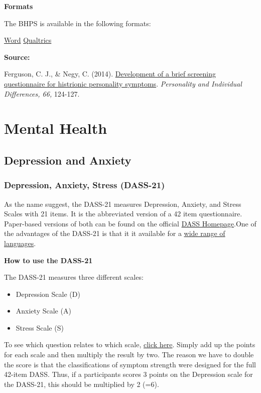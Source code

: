 \documentclass[
]{book}
\providecommand{\tightlist}{%
  \setlength{\itemsep}{0pt}\setlength{\parskip}{0pt}}
\begin{document}
\textbf{Formats}

The BHPS is available in the following formats:

\href{/questionnaires/BriefHistrionicPersonalityScale.docx}{Word} \textbar{} \href{/questionnaires/BriefHistrionicPersonalityScale.qsf}{Qualtrics}

\textbf{Source:}

Ferguson, C. J., \& Negy, C. (2014). \href{https://www.christopherjferguson.com/Histrionic.pdf}{Development of a brief screening questionnaire for histrionic personality symptoms}. \emph{Personality and Individual Differences, 66,} 124-127.

\hypertarget{mental-health}{%
\chapter{Mental Health}\label{mental-health}}

\hypertarget{depression-and-anxiety}{%
\section{Depression and Anxiety}\label{depression-and-anxiety}}

\hypertarget{depression-anxiety-stress-dass-21}{%
\subsection{Depression, Anxiety, Stress (DASS-21)}\label{depression-anxiety-stress-dass-21}}

As the name suggest, the DASS-21 measures Depression, Anxiety, and Stress Scales with 21 items. It is the abbreviated version of a 42 item questionnaire. Paper-based versions of both can be found on the official \href{http://www2.psy.unsw.edu.au/groups/dass/}{DASS Homepage}.One of the advantages of the DASS-21 is that it it available for a \href{http://www2.psy.unsw.edu.au/groups/dass/translations.htm}{wide range of languages}.

\textbf{How to use the DASS-21}

The DASS-21 measures three different scales:

\begin{itemize}
\tightlist
\item
  Depression Scale (D)
\item
  Anxiety Scale (A)
\item
  Stress Scale (S)
\end{itemize}

To see which question relates to which scale, \href{link}{click here}. Simply add up the points for each scale and then multiply the result by two. The reason we have to double the score is that the classifications of symptom strength were designed for the full 42-item DASS. Thus, if a participants scores 3 points on the Depression scale for the DASS-21, this should be multiplied by 2 (=6).
\end{document}
